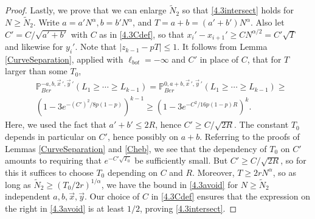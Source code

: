 \begin{proof}
		Lastly, we prove that we can enlarge $\tilde{N}_2$ so that \eqref{4.3intersect} holds for $N\geq\tilde{N}_2$. Write $a = a'N^\alpha, b = b'N^\alpha$, and $T = a+b = (a'+b')N^\alpha$. Also let $C' = C/\sqrt{a'+b'}$ with $C$ as in \eqref{4.3Cdef}, so that $x_i' - x_{i+1}' \geq CN^{\alpha/2} = C'\sqrt{T}$ and likewise for $y_i'$. Note that $|z_{k-1}-pT| \leq 1$. It follows from Lemma \ref{CurveSeparation}, applied with $\ell_{bot} = -\infty$ and $C'$ in place of $C$, that for $T$ larger than some $T_0$, 
		\begin{equation}\label{4.3avoid}
		\begin{split}
		& \mathbb{P}^{-a, b, \vec{x}\,', \vec{y}\,'}_{Ber}(L_1 \geq \cdots \geq L_{k-1}) = \mathbb{P}^{0, a+b, \vec{x}\,', \vec{y}\,'}_{Ber}(L_1 \geq \cdots \geq L_{k-1}) \geq\\ & \left(1 - 3e^{-(C')^2/8p(1-p)}\right)^{k-1} \geq \left(1 - 3e^{-C^2/16p(1-p)R}\right)^k.
		\end{split}
		\end{equation}
		Here, we used the fact that $a'+b' \leq 2R$, hence $C' \geq C/\sqrt{2R}$. The constant $T_0$ depends in particular on $C'$, hence possibly on $a+b$. Referring to the proofs of Lemmas \ref{CurveSeparation} and \ref{Cheb}, we see that the dependency of $T_0$ on $C'$ amounts to requiring that $e^{-C'\sqrt{T_0}}$ be sufficiently small. But $C' \geq C/\sqrt{2R}$, so for this it suffices to choose $T_0$ depending on $C$ and $R$. Moreover, $T\geq 2rN^\alpha$, so as long as $\tilde{N}_2 \geq (T_0/2r)^{1/\alpha}$, we have the bound in \eqref{4.3avoid} for $N\geq\tilde{N}_2$ independent $a,b,\vec{x},\vec{y}$. Our choice of $C$ in \eqref{4.3Cdef} ensures that the expression on the right in \eqref{4.3avoid} is at least $1/2$, proving \eqref{4.3intersect}.
		
	\end{proof}
	
	
	

		
	
	
